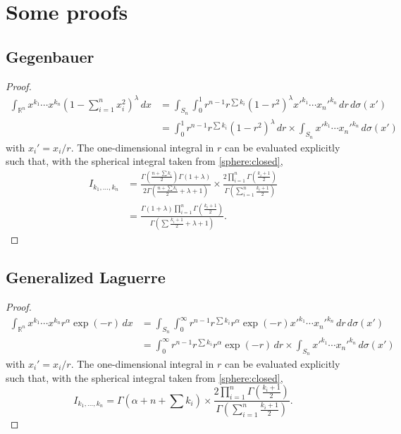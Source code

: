 \documentclass[draft]{scrartcl}
\begin{document}
\appendix

\section{Some proofs}

\subsection{Gegenbauer}\label{gegenbauer:proof}
\begin{proof}
\[
\begin{split}
\int_{\mathbb{R}^n}  x^{k_1}\cdots x^{k_n} \left(1 - \sum_{i=1}^n x_i^2\right)^\lambda \,dx
&= \int_{S_n}\int_0^1 r^{n-1} r^{\sum{k_i}} (1-r^2)^\lambda x'^{k_1}\cdots x_n'^{k_n} \,dr\,d\sigma(x')\\
&= \int_0^1 r^{n-1} r^{\sum{k_i}} (1-r^2)^\lambda\,dr \times \int_{S_n} x'^{k_1}\cdots x_n'^{k_n} \,d\sigma(x')
\end{split}
\]
with $x_i' = x_i / r$. The one-dimensional integral in $r$ can be evaluated explicitly
  such that, with the spherical integral taken from \eqref{sphere:closed},
\[
\begin{split}
I_{k_1,\dots,k_n}
&= \frac{\Gamma\left(\frac{n + \sum k_i}{2}\right)\Gamma(1+\lambda)}{2\Gamma\left(\frac{n+\sum k_i}{2} + \lambda + 1\right)}
\times
 \frac{2\prod_{i=1}^n\Gamma\left(\frac{k_i+1}{2}\right)}{\Gamma\left(\sum_{i=1}^n\frac{k_i+1}{2}\right)}\\
&= \frac{
  \Gamma(1+\lambda)\prod_{i=1}^n\Gamma\left(\frac{k_i+1}{2}\right)
}{
\Gamma\left(\sum\frac{k_i+1}{2} + \lambda + 1\right)
}.
\end{split}
\]
\end{proof}

\subsection{Generalized Laguerre}\label{gegenbauer:proof}
\begin{proof}
\[
\begin{split}
  \int_{\mathbb{R}^n}  x^{k_1}\cdots x^{k_n} r^\alpha \exp(-r) \,dx
  &= \int_{S_n}\int_0^\infty r^{n-1} r^{\sum{k_i}} r^\alpha \exp(-r) x'^{k_1}\cdots x_n'^{k_n} \,dr\,d\sigma(x')\\
  &= \int_0^\infty r^{n-1} r^{\sum{k_i}} r^\alpha \exp(-r)\,dr \times \int_{S_n} x'^{k_1}\cdots x_n'^{k_n} \,d\sigma(x')
\end{split}
\]
with $x_i' = x_i / r$. The one-dimensional integral in $r$ can be evaluated explicitly
  such that, with the spherical integral taken from \eqref{sphere:closed},
\[
I_{k_1,\dots,k_n}
  = \Gamma\left(\alpha + n + \sum k_i\right) \times
 \frac{2\prod_{i=1}^n\Gamma\left(\frac{k_i+1}{2}\right)}{\Gamma\left(\sum_{i=1}^n\frac{k_i+1}{2}\right)}.
\]
\end{proof}

{}

\end{document}
